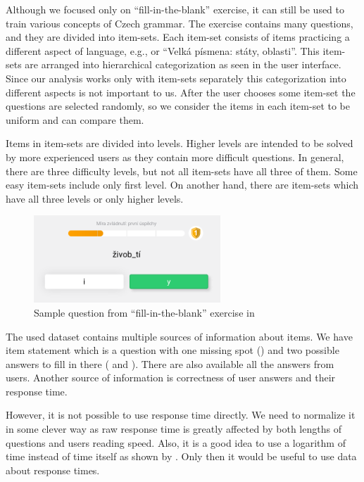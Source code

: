 \documentclass[
  printed, %
  table,   %
  nolof,     %
  nolot,     %
  color,
  final,
  nocover
]{fithesis3}
\begin{document}
Although we focused only on ``fill-in-the-blank'' exercise, it can still be used to train various concepts of Czech grammar. The exercise contains many questions, and they are divided into item-sets. Each item-set consists of items practicing a different aspect of language, e.g., \cviceniB{} or ``Velká písmena: státy, oblasti''. This item-sets are arranged into hierarchical categorization as seen in the user interface. Since our analysis works only with item-sets separately this categorization into different aspects is not important to us. After the user chooses some item-set the questions are selected randomly, so we consider the items in each item-set to be uniform and can compare them.

Items in item-sets are divided into levels. Higher levels are intended to be solved by more experienced users as they contain more difficult questions. In general, there are three difficulty levels, but not all item-sets have all three of them. Some easy item-sets include only first level. On another hand, there are item-sets which have all three levels or only higher levels.

\begin{figure}
  \includegraphics[width=7cm]{img/umimecesky_doplnovacka}
  \caption{Sample question from ``fill-in-the-blank'' exercise in \umimeCesky{}}
  \label{fig:umimecesky_doplnovacka}
\end{figure}


The used dataset contains multiple sources of information about items. We have item statement which is a question with one missing spot () and two possible answers to fill in there ( and ). There are also available all the answers from users. Another source of information is correctness of user answers and their response time.

However, it is not possible to use response time directly. We need to normalize it in some clever way as raw response time is greatly affected by both lengths of questions and users reading speed. Also, it is a good idea to use a logarithm of time instead of time itself as shown by \citeauthor{niznan2014using}\cite{niznan2014using}. Only then it would be useful to use data about response times.
\end{document}
